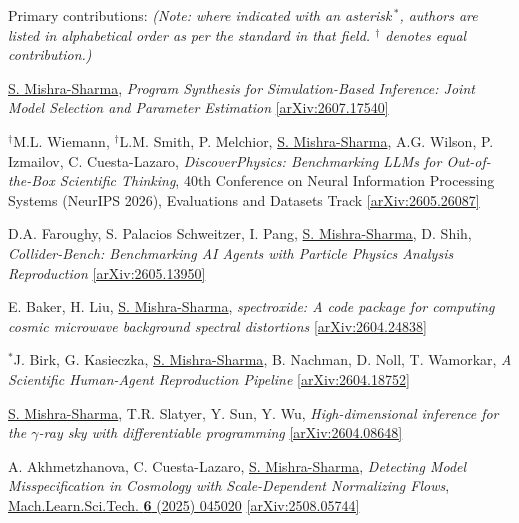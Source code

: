 \documentclass[letterpaper,11pt]{article}
\newenvironment{packed_enumerate}[1][]{
\begin{etaremune}[#1]
  \setlength{\itemsep}{4.0pt}
  \setlength{\parskip}{0pt}
  \setlength{\parsep}{0pt}}{\end{etaremune}
}
\begin{document}
\noindent
Primary contributions: \emph{(Note: where indicated with an asterisk\,$^*$, authors are listed in alphabetical order as per the standard in that field. $^{\dagger}$ denotes equal contribution.)}

\begin{packed_enumerate}[start=63]

\item \underline{S. Mishra-Sharma}, \emph{Program Synthesis for Simulation-Based Inference: Joint Model Selection and Parameter Estimation} \href{https://arxiv.org/abs/2607.17540}{[arXiv:2607.17540]}

\item $^{\dagger}$M.L. Wiemann, $^{\dagger}$L.M. Smith, P. Melchior, \underline{S. Mishra-Sharma}, A.G. Wilson, P. Izmailov, C. Cuesta-Lazaro, \emph{DiscoverPhysics: Benchmarking LLMs for Out-of-the-Box Scientific Thinking}, 40th Conference on Neural Information Processing Systems (NeurIPS 2026), Evaluations and Datasets Track \href{https://arxiv.org/abs/2605.26087}{[arXiv:2605.26087]}

\item D.A. Faroughy, S. Palacios Schweitzer, I. Pang, \underline{S. Mishra-Sharma}, D. Shih, \emph{Collider-Bench: Benchmarking AI Agents with Particle Physics Analysis Reproduction} \href{https://arxiv.org/abs/2605.13950}{[arXiv:2605.13950]}

\item E. Baker, H. Liu, \underline{S. Mishra-Sharma}, \emph{spectroxide: A code package for computing cosmic microwave background spectral distortions} \href{https://arxiv.org/abs/2604.24838}{[arXiv:2604.24838]}

\item $^*$J. Birk, G. Kasieczka, \underline{S. Mishra-Sharma}, B. Nachman, D. Noll, T. Wamorkar, \emph{A Scientific Human-Agent Reproduction Pipeline} \href{https://arxiv.org/abs/2604.18752}{[arXiv:2604.18752]}

\item \underline{S. Mishra-Sharma}, T.R. Slatyer, Y. Sun, Y. Wu, \emph{High-dimensional inference for the $\gamma$-ray sky with differentiable programming} \href{https://arxiv.org/abs/2604.08648}{[arXiv:2604.08648]}

\item A. Akhmetzhanova, C. Cuesta-Lazaro, \underline{S. Mishra-Sharma}, \emph{Detecting Model Misspecification in Cosmology with Scale-Dependent Normalizing Flows}, \href{https://iopscience.iop.org/article/10.1088/2632-2153/ae107d}{Mach.Learn.Sci.Tech. \textbf{6} (2025) 045020} \href{https://arxiv.org/abs/2508.05744}{[arXiv:2508.05744]}


\end{packed_enumerate}
\end{document}
